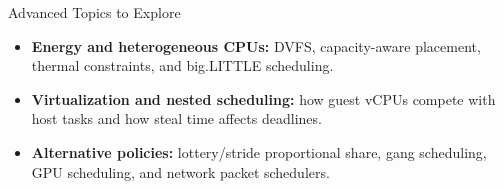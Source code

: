 \documentclass[aspectratio=169,11pt]{beamer}
\begin{document}
\begin{frame}[allowframebreaks]{Advanced Topics to Explore}
  \vspace{0.3cm}
  \begin{tcolorbox}[title=\textbf{III. Emerging \& Specialized Scheduling Areas}, colback=purple!5!white, colframe=purple!75!black, fonttitle=\bfseries]
  \begin{itemize}
      \item \textbf{Energy and heterogeneous CPUs:} DVFS, capacity-aware placement, thermal constraints, and big.LITTLE scheduling.
      \item \textbf{Virtualization and nested scheduling:} how guest vCPUs compete with host tasks and how steal time affects deadlines.
      \item \textbf{Alternative policies:} lottery/stride proportional share, gang scheduling, GPU scheduling, and network packet schedulers.
  \end{itemize}
  \end{tcolorbox}
\end{frame}
\end{document}
